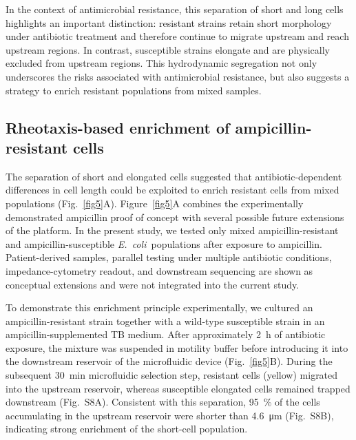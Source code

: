 \documentclass[twoside,twocolumn,9pt]{article}
\newcommand{\ecoli}{{\it E.~coli}}
\begin{document}
    In the context of antimicrobial resistance, this separation of short and long cells highlights an important distinction: resistant strains retain short morphology under antibiotic treatment and therefore continue to migrate upstream and reach upstream regions. In contrast, susceptible strains elongate and are physically excluded from upstream regions. This hydrodynamic segregation not only underscores the risks associated with antimicrobial resistance, but also suggests a strategy to enrich resistant populations from mixed samples.
    
    \subsection*{Rheotaxis-based enrichment of ampicillin-resistant cells}

    The separation of short and elongated cells suggested that antibiotic-dependent differences in cell length could be exploited to enrich resistant cells from mixed populations (Fig.~\ref{fig5}A). Figure~\ref{fig5}A combines the experimentally demonstrated ampicillin proof of concept with several possible future extensions of the platform. In the present study, we tested only mixed ampicillin-resistant and ampicillin-susceptible \ecoli\ populations after exposure to ampicillin. Patient-derived samples, parallel testing under multiple antibiotic conditions, impedance-cytometry readout, and downstream sequencing are shown as conceptual extensions and were not integrated into the current study.
    
    To demonstrate this enrichment principle experimentally, we cultured an ampicillin-resistant strain together with a wild-type susceptible strain in an ampicillin-supplemented TB medium. After approximately \SI{2}{\hour} of antibiotic exposure, the mixture was suspended in motility buffer before introducing it into the downstream reservoir of the microfluidic device (Fig.~\ref{fig5}B). During the subsequent \SI{30}{\minute} microfluidic selection step, resistant cells (yellow) migrated into the upstream reservoir, whereas susceptible elongated cells remained trapped downstream (Fig.~S8A). Consistent with this separation, \SI{95}{\percent} of the cells accumulating in the upstream reservoir were shorter than \SI{4.6}{\micro\meter} (Fig.~S8B), indicating strong enrichment of the short-cell population.
\end{document}
